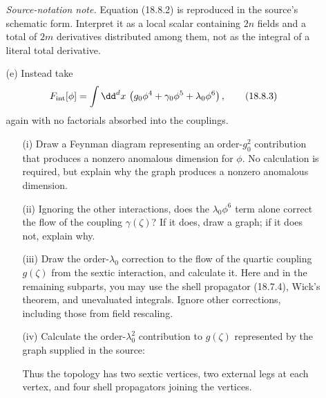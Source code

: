 \begin{enumerate}
\begin{enumerate}
    \emph{Source-notation note.}  Equation (18.8.2) is reproduced in the
    source's schematic form.  Interpret it as a local scalar containing
    \(2n\) fields and a total of \(2m\) derivatives distributed among
    them, not as the integral of a literal total derivative.

    \item[(e)]
    Instead take
    \[
      F_{\rm int}[\phi]=\int \dd^dx\,
        \left(g_0\phi^4+\gamma_0\phi^5+\lambda_0\phi^6\right),
      \tag{18.8.3}
    \]
    again with no factorials absorbed into the couplings.
    \begin{enumerate}
      \item[(i)]
      Draw a Feynman diagram representing an order-\(g_0^2\)
      contribution that produces a nonzero anomalous dimension for
      \(\phi\).  No calculation is required, but explain why the graph
      produces a nonzero anomalous dimension.

      \item[(ii)]
      Ignoring the other interactions, does the
      \(\lambda_0\phi^6\) term alone correct the flow of the coupling
      \(\gamma(\zeta)\)?  If it does, draw a graph; if it does not,
      explain why.

      \item[(iii)]
      Draw the order-\(\lambda_0\) correction to the flow of the quartic
      coupling \(g(\zeta)\) from the sextic interaction, and calculate it.
      Here and in the remaining subparts, you may use the shell
      propagator (18.7.4), Wick's theorem, and unevaluated integrals.
      Ignore other corrections, including those from field rescaling.

      \item[(iv)]
      Calculate the order-\(\lambda_0^2\) contribution to \(g(\zeta)\)
      represented by the graph supplied in the source:
      \begin{center}
      \end{center}
      Thus the topology has two sextic vertices, two external legs at
      each vertex, and four shell propagators joining the vertices.


\end{enumerate}
\end{enumerate}
\end{enumerate}
